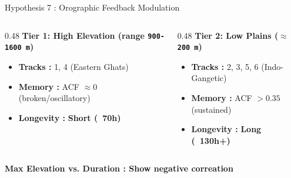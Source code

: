 \begin{frame}{Hypothesis 7 : Orographic Feedback Modulation}
	\vspace{0.15cm}
	\footnotesize
	\begin{center}
		\begin{columns}[T]
			\begin{column}{0.48\textwidth}
				\textbf{Tier 1: High Elevation (range \texttt{900-1600 m})}
				\begin{itemize}
					\item \textbf{Tracks :} 1, 4 (Eastern Ghats)
					\item \textbf{Memory :} ACF $\approx 0$ (broken/oscillatory)
					\item \textbf{Longevity :} \textbf{Short (~70h)}
				\end{itemize}
			\end{column}
			\begin{column}{0.48\textwidth}
				\textbf{Tier 2: Low Plains (\texttt{$\approx$200 m})}
				\begin{itemize}
					\item \textbf{Tracks :} 2, 3, 5, 6 (Indo-Gangetic)
					\item \textbf{Memory :} ACF $> 0.35$ (sustained)
					\item \textbf{Longevity :} \textbf{Long (~130h+)}
				\end{itemize}
			\end{column}
		\end{columns}
	\end{center}

	\vspace{0.3cm}
	\centering
	\textbf{Max Elevation vs. Duration : Show negative correation} \\
\end{frame}

